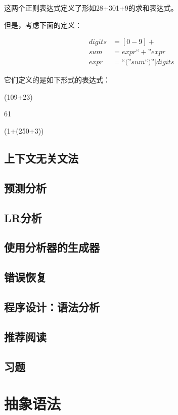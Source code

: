 \documentclass[cn,11pt,chinese]{elegantbook}
\begin{document}
这两个正则表达式定义了形如28+301+9的求和表达式。

但是，考虑下面的定义：

\begin{align*}
digits &= [0-9]+ \\
sum &= expr\text{``}+\text{''}expr \\
expr &= \text{``(''}sum\text{``)''}|digits
\end{align*}

它们定义的是如下形式的表达式：

(109+23)

61

(1+(250+3))



\section{上下文无关文法}

\section{预测分析}

\section{LR分析}

\section{使用分析器的生成器}

\section{错误恢复}

\section{程序设计：语法分析}

\section{推荐阅读}

\section{习题}

\chapter{抽象语法}
\end{document}
